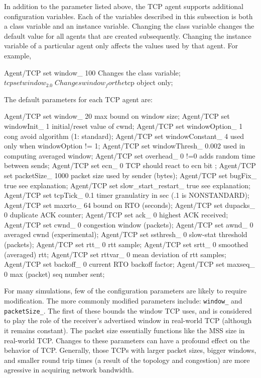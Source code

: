 \documentclass{article}
\begin{document}
In addition to the  parameter listed above,
the TCP agent supports additional configuration variables.
Each of the variables described in this subsection is
both a class variable and an instance variable.
Changing the class variable changes the default value
for all agents that are created subsequently.
Changing the instance variable of a particular agent
only affects the values used by that agent.
For example,
\begin{program}
  Agent/TCP set window_ 100     \; Changes the class variable;
  $tcp set window_ 2.0          \; Changes window_ for the $tcp object only;
\end{program}

The default parameters for each TCP agent are:
\begin{program}
Agent/TCP set window_   20              \; max bound on window size;
Agent/TCP set windowInit_ 1             \; initial/reset value of cwnd;
Agent/TCP set windowOption_ 1           \; cong avoid algorithm (1: standard);
Agent/TCP set windowConstant_ 4         \; used only when windowOption != 1;
Agent/TCP set windowThresh_ 0.002       \; used in computing averaged window;
Agent/TCP set overhead_ 0               \; !=0 adds random time between sends;
Agent/TCP set ecn_ 0                    \; TCP should react to ecn bit ;
Agent/TCP set packetSize_ 1000          \; packet size used by sender (bytes);
Agent/TCP set bugFix_ true              \; see explanation;
Agent/TCP set slow_start_restart_ true  \; see explanation;
Agent/TCP set tcpTick_ 0.1              \; timer granulatiry in sec (.1 is NONSTANDARD);
Agent/TCP set maxrto_ 64                \; bound on RTO (seconds);
Agent/TCP set dupacks_ 0                \; duplicate ACK counter;
Agent/TCP set ack_ 0                    \; highest ACK received;
Agent/TCP set cwnd_ 0                   \; congestion window (packets);
Agent/TCP set awnd_ 0                   \; averaged cwnd (experimental);
Agent/TCP set ssthresh_ 0               \; slow-stat threshold (packets);
Agent/TCP set rtt_ 0                    \; rtt sample;
Agent/TCP set srtt_ 0                   \; smoothed (averaged) rtt;
Agent/TCP set rttvar_ 0                 \; mean deviation of rtt samples;
Agent/TCP set backoff_ 0                \; current RTO backoff factor;
Agent/TCP set maxseq_ 0                 \; max (packet) seq number sent;

\end{program}

For many simulations, few of the configuration parameters are likely
to require modification.
The more commonly modified parameters include: {\tt window\_} and
{\tt packetSize\_}.
The first of these bounds the window TCP uses, and is considered
to play the role of the receiver's advertised window in real-world
TCP (although it remains constant).
The packet size essentially functions like the MSS size in real-world
TCP.
Changes to these parameters can have a profound effect on the behavior
of TCP.
Generally, those TCPs with larger packet sizes, bigger windows, and
smaller round trip times (a result of the topology and congestion) are
more agressive in acquiring network bandwidth.
\end{document}
